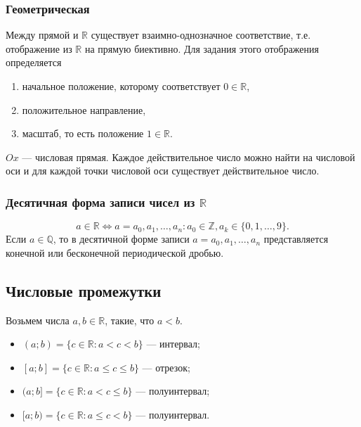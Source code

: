 \documentclass[a4paper,12pt]{article} %
\theoremstyle{remark}
\theoremstyle{definition}
\begin{document}
\subsubsection*{Геометрическая}
Между прямой и $\mathbb{R}$ существует взаимно-однозначное соответствие, т.е. отображение из $\mathbb{R}$ на прямую биективно. Для задания этого отображения определяется
\begin{enumerate}
	\item начальное положение, которому соответствует $0\in \mathbb{R}$,
	\item положительное направление,
	\item масштаб, то есть положение $1\in \mathbb{R}$.
\end{enumerate}
$Ox$ --- числовая прямая. Каждое действительное число можно найти на числовой оси и для каждой точки числовой оси существует действительное число.
\begin{center}
\end{center}
\subsubsection*{Десятичная форма записи чисел из $\mathbb{R}$ }
\[
a \in \mathbb{R} \iff a = a_0, a_1, \ldots, a_n : a_0 \in \mathbb{Z}, a_k \in \{0, 1, \ldots, 9\} 
.\] 
Если $a\in \mathbb{Q}$, то в десятичной форме записи $a = a_0, a_1, \ldots, a_n$ представляется конечной или бесконечной периодической дробью.
\subsection{Числовые промежутки}
Возьмем числа $a, b \in \mathbb{R}$, такие, что $a < b$.
\begin{itemize}
	\item $(a; b) = \{c\in \mathbb{R} : a < c < b\} $ --- интервал;
	\item $[a; b] = \{c \in  \mathbb{R} : a \le c \le b\} $ --- отрезок;
	\item $(a; b] = \{c \in  \mathbb{R}: a < c \le b\} $ --- полуинтервал;
	\item $[a; b) = \{c \in  \mathbb{R}: a \le  c < b\} $ --- полуинтервал.
\end{itemize}
\end{document}
